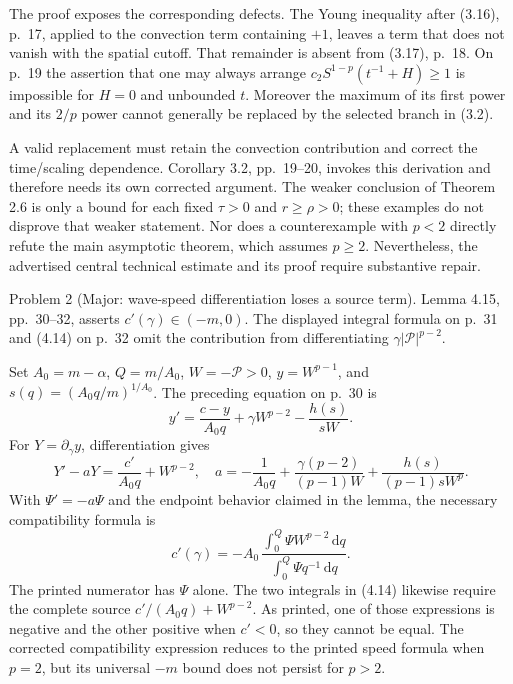 \documentclass[10pt]{article}
\begin{document}
The proof exposes the corresponding defects. The Young inequality after (3.16), p. 17, applied to the convection term containing \(+1\), leaves a term that does not vanish with the spatial cutoff. That remainder is absent from (3.17), p. 18. On p. 19 the assertion that one may always arrange \(c_2S^{1-p}(t^{-1}+H)\geq1\) is impossible for \(H=0\) and unbounded \(t\). Moreover the maximum of its first power and its \(2/p\) power cannot generally be replaced by the selected branch in (3.2).\par
A valid replacement must retain the convection contribution and correct the time/scaling dependence. Corollary 3.2, pp. 19–20, invokes this derivation and therefore needs its own corrected argument. The weaker conclusion of Theorem 2.6 is only a bound for each fixed \(\tau>0\) and \(r\geq\rho>0\); these examples do not disprove that weaker statement. Nor does a counterexample with \(p<2\) directly refute the main asymptotic theorem, which assumes \(p\geq2\). Nevertheless, the advertised central technical estimate and its proof require substantive repair.\par
Problem 2 (Major: wave-speed differentiation loses a source term).  Lemma 4.15, pp. 30–32, asserts \(c'(\gamma)\in(-m,0)\). The displayed integral formula on p. 31 and (4.14) on p. 32 omit the contribution from differentiating \(\gamma|\mathcal P|^{p-2}\).\par
Set \(A_0=m-\alpha\), \(Q=m/A_0\), \(W=-\mathcal P>0\), \(y=W^{p-1}\), and \(s(q)=(A_0q/m)^{1/A_0}\). The preceding equation on p. 30 is \[y'=\frac{c-y}{A_0q}+\gamma W^{p-2}
                  -\frac{h(s)}{sW}.\] For \(Y=\partial_\gamma y\), differentiation gives \[Y'-aY=\frac{c'}{A_0q}+W^{p-2},
 \quad
 a=-\frac1{A_0q}+
 \frac{\gamma(p-2)}{(p-1)W}
 +\frac{h(s)}{(p-1)sW^p}.\] With \(\Psi'=-a\Psi\) and the endpoint behavior claimed in the lemma, the necessary compatibility formula is \[c'(\gamma)=
 -A_0\,\frac{\displaystyle\int_0^Q\Psi W^{p-2}\,\mathrm dq}
                   {\displaystyle\int_0^Q\Psi q^{-1}\,\mathrm dq}.\] The printed numerator has \(\Psi\) alone. The two integrals in (4.14) likewise require the complete source \(c'/(A_0q)+W^{p-2}\). As printed, one of those expressions is negative and the other positive when \(c'<0\), so they cannot be equal. The corrected compatibility expression reduces to the printed speed formula when \(p=2\), but its universal \(-m\) bound does not persist for \(p>2\).\par
\end{document}

